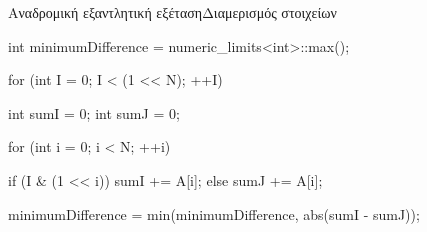 \documentclass[t,aspectratio=169,9pt]{beamer}
\begin{document}
\begin{frame}[fragile]{Αναδρομική εξαντλητική εξέταση}{Διαμερισμός στοιχείων}
  \begin{cpp}
    int minimumDifference = numeric_limits<int>::max();

    for (int I = 0; I < (1 << N); ++I)
    {
        int sumI = 0;
        int sumJ = 0;

        for (int i = 0; i < N; ++i)
        {
            if (I & (1 << i))
            {
                sumI += A[i];
            }
            else
            {
                sumJ += A[i];
            }
            
            minimumDifference = min(minimumDifference, abs(sumI - sumJ));
        }
    }
  \end{cpp}
\end{frame}

\pdpclosingframe               %
\end{document}
